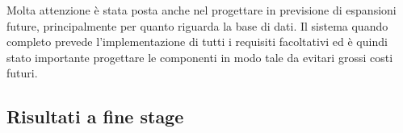 Molta attenzione è stata posta anche nel progettare in previsione di espansioni future, principalmente per quanto riguarda la base di dati. Il sistema quando completo prevede l'implementazione di tutti i requisiti facoltativi ed è quindi stato importante progettare le componenti in modo tale da evitari grossi costi futuri.


\subsection{Risultati a fine stage}
